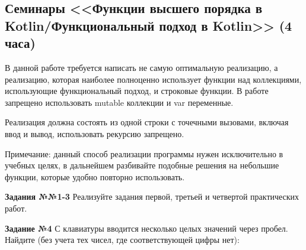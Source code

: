 \subsection{Семинары <<Функции высшего порядка в Kotlin/Функциональный подход в Kotlin>> (4 часа)}
В данной работе требуется написать не самую оптимальную реализацию, а реализацию, 
которая наиболее полноценно использует функции над
коллекциями, использующие функциональный подход, и строковые функции. В работе запрещено использовать mutable коллекции и var переменные.

Реализация должна состоять из одной строки с точечными вызовами, включая ввод и вывод, использовать рекурсию запрещено.

Примечание: данный способ реализации программы нужен исключительно в учебных целях, в дальнейшем разбивайте подобные решения на небольшие функции,
которые удобно повторно использовать.

\textbf{Задания №№1-3} Реализуйте задания первой, третьей и четвертой практических работ.

\textbf{Задание №4} С клавиатуры вводится несколько целых значений через пробел. Найдите (без учета тех чисел, где соответствующей цифры нет):

